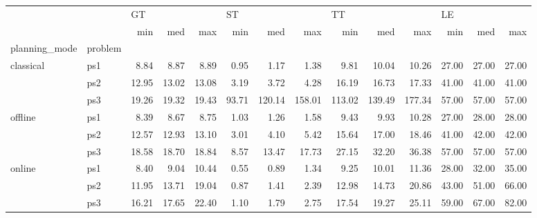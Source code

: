 \begin{tabular}{llrrrrrrrrrrrr}
\toprule
       &     & \multicolumn{3}{l}{GT} & \multicolumn{3}{l}{ST} & \multicolumn{3}{l}{TT} & \multicolumn{3}{l}{LE} \\
       &     &   min &   med &   max &   min &    med &    max &    min &    med &    max &   min &   med &   max \\
planning\_mode & problem &       &       &       &       &        &        &        &        &        &       &       &       \\
\midrule
classical & ps1 &  8.84 &  8.87 &  8.89 &  0.95 &   1.17 &   1.38 &   9.81 &  10.04 &  10.26 & 27.00 & 27.00 & 27.00 \\
       & ps2 & 12.95 & 13.02 & 13.08 &  3.19 &   3.72 &   4.28 &  16.19 &  16.73 &  17.33 & 41.00 & 41.00 & 41.00 \\
       & ps3 & 19.26 & 19.32 & 19.43 & 93.71 & 120.14 & 158.01 & 113.02 & 139.49 & 177.34 & 57.00 & 57.00 & 57.00 \\
offline & ps1 &  8.39 &  8.67 &  8.75 &  1.03 &   1.26 &   1.58 &   9.43 &   9.93 &  10.28 & 27.00 & 28.00 & 28.00 \\
       & ps2 & 12.57 & 12.93 & 13.10 &  3.01 &   4.10 &   5.42 &  15.64 &  17.00 &  18.46 & 41.00 & 42.00 & 42.00 \\
       & ps3 & 18.58 & 18.70 & 18.84 &  8.57 &  13.47 &  17.73 &  27.15 &  32.20 &  36.38 & 57.00 & 57.00 & 57.00 \\
online & ps1 &  8.40 &  9.04 & 10.44 &  0.55 &   0.89 &   1.34 &   9.25 &  10.01 &  11.36 & 28.00 & 32.00 & 35.00 \\
       & ps2 & 11.95 & 13.71 & 19.04 &  0.87 &   1.41 &   2.39 &  12.98 &  14.73 &  20.86 & 43.00 & 51.00 & 66.00 \\
       & ps3 & 16.21 & 17.65 & 22.40 &  1.10 &   1.79 &   2.75 &  17.54 &  19.27 &  25.11 & 59.00 & 67.00 & 82.00 \\
\bottomrule
\end{tabular}
